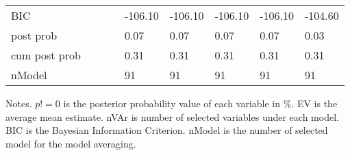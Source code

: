 \documentclass[12pt, english]{article}
\begin{document}
\begin{table}[]
{\begin{tabular}{@{}lllllllll@{}}
                BIC                         &        &         &        & -106.10 & -106.10 & -106.10 & -106.10 & -104.60 \\
                post prob                   &        &         &        & 0.07    & 0.07    & 0.07    & 0.07    & 0.03    \\
                cum post prob               &        &         &        & 0.31    & 0.31    & 0.31    & 0.31    & 0.31    \\
                nModel                      &        &         &        & 91      & 91      & 91      & 91      & 91      \\ \bottomrule
            \end{tabular}%
        }
        \begin{minipage}{19cm}
            \vspace{0.1cm}
            \small Notes. $p!=0$ is the posterior probability value of each variable in \%. EV is the average mean estimate. nVAr is number of selected variables under each model. BIC is the Bayesian Information Criterion. nModel is the number of selected model for the model averaging.
        \end{minipage}
    \end{table}



    \newpage
    \printbibliography
\end{document}
